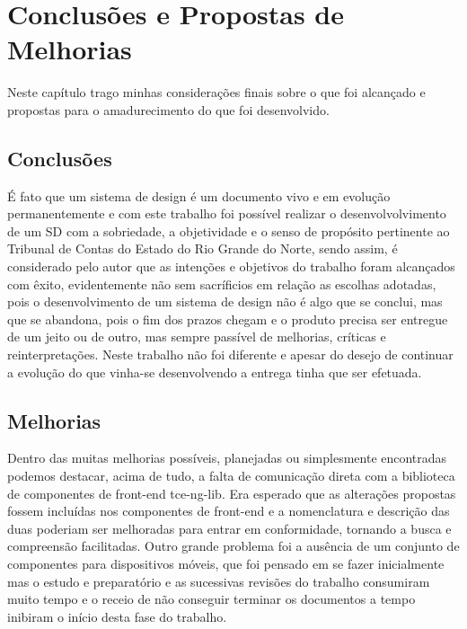 \chapter[Capítulo 5]{Conclusões e Propostas de Melhorias}
\label{ch:cap5}

  Neste capítulo trago minhas considerações finais sobre o que foi alcançado e propostas para o amadurecimento do que foi desenvolvido.

\section{Conclusões}\label{cap5:conclusao}

  É fato que um sistema de design é um documento vivo e em evolução permanentemente e com este trabalho foi possível realizar o desenvolvolvimento de um SD com a sobriedade, a objetividade e o senso de propósito pertinente ao Tribunal de Contas do Estado do Rio Grande do Norte, sendo assim, é considerado pelo autor que as intenções e objetivos do trabalho foram alcançados com êxito, evidentemente não sem sacríficios em relação as escolhas adotadas, pois o desenvolvimento de um sistema de design não é algo que se conclui, mas que se abandona, pois o fim dos prazos chegam e o produto precisa ser entregue de um jeito ou de outro, mas sempre passível de melhorias, críticas e reinterpretações. Neste trabalho não foi diferente e apesar do desejo de continuar a evolução do que vinha-se desenvolvendo a entrega tinha que ser efetuada.

\section{Melhorias}\label{cap5:melhorias}

  Dentro das muitas melhorias possíveis, planejadas ou simplesmente encontradas podemos destacar, acima de tudo, a falta de comunicação direta com a biblioteca de componentes de front-end tce-ng-lib. Era esperado que as alterações propostas fossem incluídas nos componentes de front-end e a nomenclatura e descrição das duas poderiam ser melhoradas para entrar em conformidade, tornando a busca e compreensão facilitadas. Outro grande problema foi a ausência de um conjunto de componentes para dispositivos móveis, que foi pensado em se fazer inicialmente mas o estudo e preparatório e as sucessivas revisões do trabalho consumiram muito tempo e o receio de não conseguir terminar os documentos a tempo inibiram o início desta fase do trabalho.


